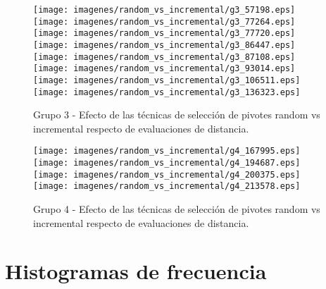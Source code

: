 \begin{figure}[h!]
\centering
{\texttt{[image: imagenes/random\_vs\_incremental/g3\_57198.eps]}}
{\texttt{[image: imagenes/random\_vs\_incremental/g3\_77264.eps]}}
{\texttt{[image: imagenes/random\_vs\_incremental/g3\_77720.eps]}}
{\texttt{[image: imagenes/random\_vs\_incremental/g3\_86447.eps]}}
{\texttt{[image: imagenes/random\_vs\_incremental/g3\_87108.eps]}}
{\texttt{[image: imagenes/random\_vs\_incremental/g3\_93014.eps]}}
{\texttt{[image: imagenes/random\_vs\_incremental/g3\_106511.eps]}}
{\texttt{[image: imagenes/random\_vs\_incremental/g3\_136323.eps]}}
\caption{\small Grupo 3 - Efecto de las t\'ecnicas de selecci\'on de pivotes random vs incremental respecto de evaluaciones de distancia.}
\end{figure}

\begin{figure}[h!]
\centering
{\texttt{[image: imagenes/random\_vs\_incremental/g4\_167995.eps]}}
{\texttt{[image: imagenes/random\_vs\_incremental/g4\_194687.eps]}}
{\texttt{[image: imagenes/random\_vs\_incremental/g4\_200375.eps]}}
{\texttt{[image: imagenes/random\_vs\_incremental/g4\_213578.eps]}}
\caption{\small Grupo 4 - Efecto de las t\'ecnicas de selecci\'on de pivotes random vs incremental respecto de evaluaciones de distancia.}
\end{figure}

\chapter{Histogramas de frecuencia}\label{anexo.B}

